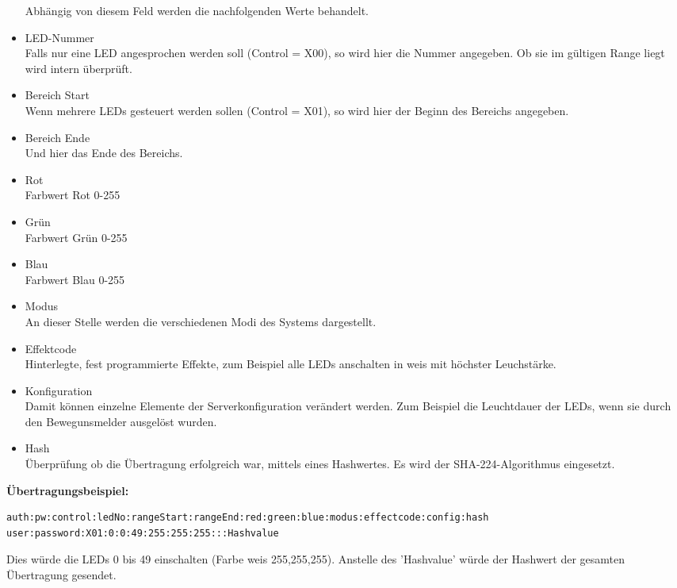 \begin{itemize}
Abhängig von diesem Feld werden die nachfolgenden Werte behandelt.
\item LED-Nummer\\
Falls nur eine LED angesprochen werden soll (Control = X00), so wird hier die Nummer angegeben. Ob sie im gültigen Range liegt wird intern überprüft.
\item Bereich Start\\
Wenn mehrere LEDs gesteuert werden sollen (Control = X01), so wird hier der Beginn des Bereichs angegeben.
\item Bereich Ende\\
Und hier das Ende des Bereichs.
\item Rot\\
Farbwert Rot 0-255
\item Grün\\
Farbwert Grün 0-255
\item Blau\\
Farbwert Blau 0-255
\item Modus\\
An dieser Stelle werden die verschiedenen Modi des Systems dargestellt.
\item Effektcode\\
Hinterlegte, fest programmierte Effekte, zum Beispiel alle LEDs anschalten in weis mit höchster Leuchstärke.
\item Konfiguration\\
Damit können einzelne Elemente der Serverkonfiguration verändert werden. Zum Beispiel die Leuchtdauer der LEDs, wenn sie durch den Bewegunsmelder ausgelöst wurden. 
\item Hash\\
Überprüfung ob die Übertragung erfolgreich war, mittels eines Hashwertes. Es wird der SHA-224-Algorithmus eingesetzt.
\end{itemize}
\textbf{Übertragungsbeispiel:}\\
\begin{lstlisting}[caption = Beispielübertragung des Protokolls, frame=single, breaklines=true,columns=fullflexible, commentstyle=\color{gray}\upshape, captionpos=b]
auth:pw:control:ledNo:rangeStart:rangeEnd:red:green:blue:modus:effectcode:config:hash
user:password:X01:0:0:49:255:255:255:::Hashvalue
\end{lstlisting}
Dies würde die LEDs 0 bis 49 einschalten (Farbe weis 255,255,255). Anstelle des 'Hashvalue' würde der Hashwert der gesamten Übertragung gesendet.

